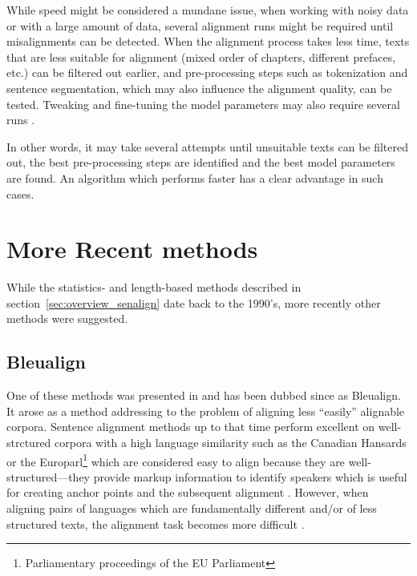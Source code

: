 While speed might be considered a mundane issue, when working with noisy data or with a large amount of data, several alignment runs might be required until misalignments can be detected. 
When the alignment process takes less time,  texts that are less suitable for alignment (mixed order of chapters, different prefaces, etc.) 
can be filtered out earlier, and pre-processing steps such as tokenization and sentence segmentation, which may also influence the alignment quality, can be tested. 
Tweaking and fine-tuning the model parameters may also require several runs \autocite{hunalign}. 

In other words, it may take several attempts until unsuitable texts can be filtered out, the best pre-processing steps are identified and the best model parameters are found. 
An algorithm which performs faster has a clear advantage in such cases.


\section{More Recent methods}
While the statistics- and length-based  methods described in section~\ref{sec:overview_senalign} date back to the 1990's, more recently other methods were suggested.

\subsection{Bleualign}

One of these methods was presented in \cite{sennrich-volk-2010-mt} and has been dubbed since as Bleualign. 
It arose as a method addressing to the problem of aligning less \enquote{easily} alignable corpora. 
Sentence alignment methods up to that time perform excellent on well-strctured corpora with a high language similarity such as the Canadian Hansards  or the Europarl\footnote{Parliamentary proceedings of the EU Parliament}  which are considered easy to align because they are well-structured---they provide markup information to identify speakers which is useful for creating anchor points and the subsequent alignment \autocites{simard-plamondon-1996-bilingual,sennrich-volk-2011-iterative}. 
However, when aligning pairs of languages which are fundamentally different and/or of less structured texts, the alignment task becomes more difficult \autocite{sennrich-volk-2010-mt}.

